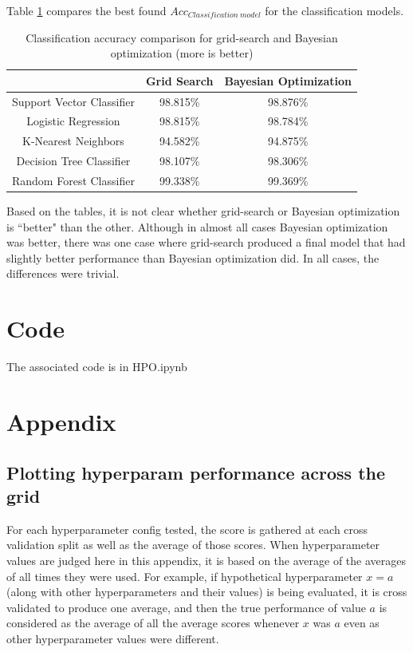 \documentclass[12pt, letterpaper]{article}
\begin{document}
Table \ref{perf_measures_cls} compares the best found $Acc_{Classification\ model}$ for the classification models.

\begin{table}[H]
\centering
\caption{Classification accuracy comparison for grid-search and Bayesian optimization (more is better)}
\label{perf_measures_cls}
\begin{tabular}{c|c|c} %
                            & Grid Search     & Bayesian Optimization  \\ \hline
Support Vector Classifier   & 98.815\% & 98.876\%\\
Logistic Regression         & 98.815\% & 98.784\%\\
K-Nearest Neighbors         & 94.582\% & 94.875\%\\
Decision Tree Classifier    & 98.107\% & 98.306\%\\
Random Forest Classifier    & 99.338\% & 99.369\%\\
\end{tabular}
\end{table}

Based on the tables, it is not clear whether grid-search or Bayesian optimization is ``better" than the other. Although in almost all cases Bayesian optimization was better, there was one case where grid-search produced a final model that had slightly better performance than Bayesian optimization did. In all cases, the differences were trivial.

\section{Code} %

The associated code is in HPO.ipynb

\section{Appendix}
\subsection{Plotting hyperparam performance across the grid}

For each hyperparameter config tested, the score is gathered at each cross validation split as well as the average of those scores. When hyperparameter values are judged here in this appendix, it is based on the average of the averages of all times they were used. For example, if hypothetical hyperparameter $x = a$ (along with other hyperparameters and their values) is being evaluated, it is cross validated to produce one average, and then the true performance of value $a$ is considered as the average of all the average scores whenever $x$ was $a$ even as other hyperparameter values were different.
\end{document}
